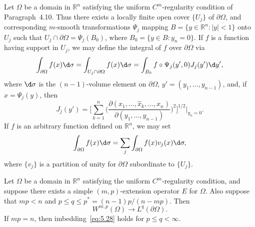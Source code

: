 \begin{para}
  Let $\Omega$ be a domain in $\mathbb{R}^n$ satisfying the uniform $C^m$-regularity
  condition of Paragraph~4.10. Thus there exists a locally finite open cover
  $\{U_j\}$ of $\partial\Omega$, and corresponding $m$-smooth transformations
  $\Psi_j$ mapping $B = \{y\in \mathbb{R}^n : |y|<1\}$ onto $U_j$ such that
  $U_j\cap \partial\Omega = \Psi_j(B_0)$, where $B_0 = \{y\in B : y_n = 0\}$.
  If $f$ is a function having support in $U_j$, we may define the integral
  of $f$ over $\partial\Omega$ via
  \[ \int_{\partial\Omega} f(x) \d\sigma
      = \int_{U_j\cap\partial\Omega} f(x) \d\sigma
      = \int_{B_0} f\circ \Psi_j(y',0) J_j(y') \d y', \]
  where $\d\sigma$ is the $(n-1)$-volume element on $\partial\Omega$,
  $y' = (y_1,\ldots,y_{n-1})$, and, if $x = \Psi_j(y)$, then
  \[ J_j(y') = \Biggl[\sum_{k=1}^n \biggl(
    \frac{\partial(x_1,\ldots,\hat{x}_k,\ldots,x_n)}{\partial(y_1,\ldots,y_{n-1})}
    \biggr)^2\Biggr]^{1/2} \Bigg|_{y_n = 0}. \]
  If $f$ is an arbitrary function defined on $\mathbb{R}^n$, we may set
  \[ \int_{\partial\Omega} f(x) \d\sigma = \sum_j \int_{\partial\Omega}
      f(x) v_j(x) \d\sigma, \]
  where $\{v_j\}$ is a partition of unity for $\partial\Omega$
  subordinate to $\{U_j\}$.
\end{para}


\begin{theorem}
  Let $\Omega$ be a domain in $\mathbb{R}^n$ satisfying the uniform
  $C^m$-regularity condition, and suppose there exists a simple
  $(m,p)$-extension operator $E$ for $\Omega$. Also suppose that $mp<n$
  and $p\leq q\leq p^* = (n-1)p/(n-mp)$. Then
  \begin{equation}\label{eq:5.28}
    W^{m,p}(\Omega) \to L^q(\partial\Omega).
  \end{equation}
  If $mp=n$, then imbedding~\eqref{eq:5.28} holds for $p\leq q<\infty$.
\end{theorem}

